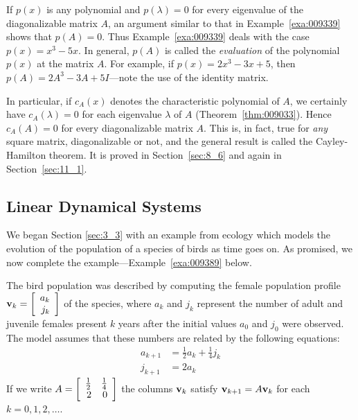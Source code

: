 If $p(x)$ is any polynomial and $p(\lambda) = 0$ for every eigenvalue of the diagonalizable matrix $A$, an argument similar to that in Example~\ref{exa:009339} shows that $p(A) = 0$. Thus Example~\ref{exa:009339} deals with the case $p(x) = x^{3} - 5x$. In general, $p(A)$ is called the \textit{evaluation} of the polynomial $p(x)$ at the matrix $A$. For example, if $p(x) = 2x^{3} - 3x + 5$, then $p(A) = 2A^{3} - 3A + 5I$---note the use of the identity matrix.


In particular, if $c_{A}(x)$ denotes the characteristic polynomial of $A$, we certainly have $c_{A}(\lambda) = 0$ for each eigenvalue $\lambda$ of $A$ (Theorem~\ref{thm:009033}). Hence $c_{A}(A) = 0$ for every diagonalizable matrix $A$. This is, in fact, true for \textit{any} square matrix, diagonalizable or not, and the general result is called the Cayley-Hamilton theorem. It is proved in Section~\ref{sec:8_6} and again in Section~\ref{sec:11_1}. 


\subsection*{Linear Dynamical Systems}

We began Section \ref{sec:3_3} with an example from ecology which models the evolution of the 
population of a species of birds as time goes on. As promised, we now 
complete the example---Example~\ref{exa:009389} below.


The bird population was described by computing the female population profile $\textbf{v}_k = \left[ \begin{array}{r}
a_k \\
j_k
\end{array}\right]$
 of the species, where $a_{k}$ and $j_{k}$ represent the number of adult and juvenile females present $k$ years after the initial values $a_{0}$ and $j_{0}$ were observed. The model assumes that these numbers are related by the following equations:
\begin{align*}
a_{k+1} &= \frac{1}{2} a_k + \frac{1}{4}j_k \\
j_{k+1} &= 2a_k
\end{align*}
If we write $A = \left[ \begin{array}{rr}
\tfrac{1}{2} & \tfrac{1}{4} \\
2 & 0 
\end{array}\right]$
 the columns $\textbf{v}_{k}$ satisfy $\textbf{v}_{k+1} = A\textbf{v}_{k}$ for each $k = 0, 1, 2, \dots$.

